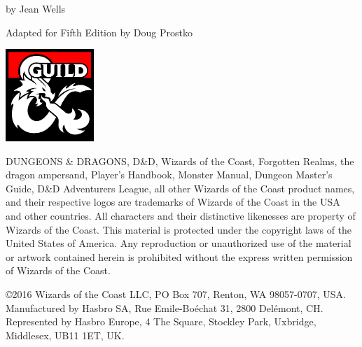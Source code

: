 \documentclass[10pt,twoside,twocolumn]{article}
\begin{document}
\begin{titlepage}
\begin{onecolumn}
\begin{center}
            \vspace{0.5cm}


            {\Large by Jean Wells}

            {\Large Adapted for Fifth Edition by Doug Prostko}

            \vspace{0.35cm}
            \includegraphics[width=0.25\textwidth]{img/dmsguild.jpg}
        \end{center}

        \begin{minipage}{0.94\textwidth}
            {\footnotesize
                DUNGEONS \& DRAGONS, D\&D, Wizards of the Coast, Forgotten
                Realms, the dragon ampersand, Player’s Handbook, Monster
                Manual, Dungeon Master’s Guide, D\&D Adventurers League,
                all other Wizards of the Coast product names, and their
                respective logos are trademarks of Wizards of the Coast
                in the USA and other countries. All characters and their
                distinctive likenesses are property of Wizards of the
                Coast. This material is protected under the copyright
                laws of the United States of America. Any reproduction
                or unauthorized use of the material or artwork contained
                herein is prohibited without the express written
                permission of Wizards of the Coast.

                \vspace{1em}

                \copyright 2016 Wizards of the Coast LLC, PO Box 707, Renton, WA
                98057-0707, USA. Manufactured by Hasbro SA, Rue
                Emile-Boéchat 31, 2800 Delémont, CH. Represented by
                Hasbro Europe, 4 The Square, Stockley Park, Uxbridge,
                Middlesex, UB11 1ET, UK.
            }
        \end{minipage} 
    \end{onecolumn} 
\end{titlepage} 
\clearpage

\setcounter{tocdepth}{2}
\begin{onecolumn}
    \tableofcontents
\end{onecolumn}








\printindex[monsters]
\printindex[magic]

\end{document}
